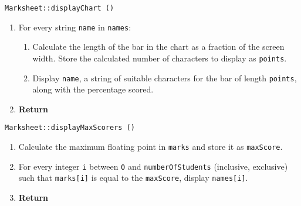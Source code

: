 \vspace{5mm}
{\tt Marksheet::displayChart ()}
\begin{enumerate}
	\item	For every string {\tt name} in {\tt names}:
	\begin{enumerate}
		\item	Calculate the length of the bar in the chart as a fraction of the screen width.
				Store the calculated number of characters to display as {\tt points}.
		\item	Display {\tt name}, a string of suitable characters for the bar of length {\tt points},
				along with the percentage scored.
	\end{enumerate}
	\item	{\bf Return}
\end{enumerate}
\vspace{5mm}
{\tt Marksheet::displayMaxScorers ()}
\begin{enumerate}
	\item	Calculate the maximum floating point in {\tt marks} and store it as {\tt maxScore}.
	\item	For every integer {\tt i} between {\tt 0} and {\tt numberOfStudents} (inclusive, exclusive)
			such that {\tt marks[i]} is equal to the {\tt maxScore}, display {\tt names[i]}.
	\item	{\bf Return}
\end{enumerate}

\clearpage
\sourcecode



